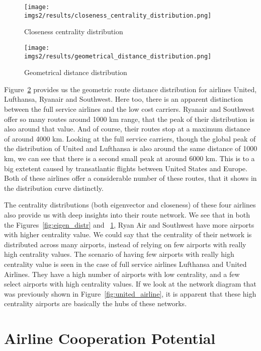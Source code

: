 \documentclass[twocolumn]{tum-article}
\begin{document}
\begin{figure}
        \centering
        \texttt{[image: imgs2/results/closeness\_centrality\_distribution.png]}
        \caption{
Closeness centrality distribution}
        \label{fig:closeness_distr}
\end{figure}


\begin{figure}
        \centering
        \texttt{[image: imgs2/results/geometrical\_distance\_distribution.png]}
        \caption{
Geometrical distance distribution}
        \label{fig:geometric_distr}
\end{figure}

Figure~\ref{fig:geometric_distr} provides us the geometric route distance distribution for airlines United, Lufthansa, Ryanair and Southwest. Here too, there is an apparent distinction between the full service airlines and the low cost carriers. 	
Ryanair and Southwest offer so many routes around 1000 km range, that the peak of their distribution is also around that value.
And of course, their routes stop at a maximum distance of around 4000 km. 
Looking at the full service carriers, though the global peak of the distribution of United and Lufthansa is also around the same distance of 1000 km, we can see that there is a second small peak at around 6000 km. This is to a big extetent caused by transatlantic flights between United States and Europe. 
Both of these airlines offer a considerable number of these routes, that it shows in the distribution curve distinctly. 


The centrality distributions (both eigenvector and closeness) of these four airlines also provide us with deep insights into their route network. 
We see that in both the Figures~\ref{fig:eigen_distr} and ~\ref{fig:closeness_distr}, Ryan Air and Southwest have more airports with higher centrality value.
We could say that the centrality of their network is distributed across many airports, instead of relying on few airports with really high centrality values. 
The scenario of having few airports with really high centrality value is seen in the case of full service airlines Lufthansa and United Airlines. They have a high number of airports with low centrality, and a few select airports with high centrality values.
If we look at the network diagram that was previously shown in Figure~\ref{fig:united_airline}, it is apparent that these high centrality airports are basically the hubs of these networks.  

\section{Airline Cooperation Potential}
\end{document}

